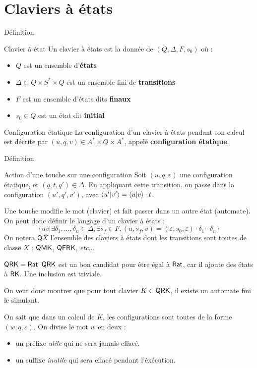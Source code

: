 \documentclass[11pt,french]{beamer}
\begin{document}
\section{Claviers à états}
\begin{frame}{Définition}
	\begin{block}{Clavier à état}
		Un clavier à états est la donnée de $(Q,\Delta ,F,s_0)$ où :
        \begin{itemize}
            \item $Q$ est un ensemble d'\textbf{états}
            \item $\Delta \subset Q \times S^* \times Q$ est un ensemble fini de \textbf{transitions}
            \item $F$ est un ensemble d'états dits \textbf{finaux}
            \item $s_0 \in Q$ est un état dit \textbf{initial}
        \end{itemize}
	\end{block}
	\pause
	\begin{block}{Configuration étatique}
		La configuration d'un clavier à états pendant son calcul est décrite par $(u,q,v) \in A^* \times Q \times A^*$, appelé \textbf{configuration étatique}.
	\end{block}
\end{frame}
\begin{frame}{Définition}
	\begin{exampleblock}{Action d'une touche sur une configuration}	
		Soit $(u,q,v)$ une configuration étatique, et $(q,t,q') \in \Delta$. En appliquant cette transition, on passe dans la configuration $(u',q',v')$, avec $\left\langle u' \middle| v' \right\rangle = \left\langle u \middle| v \right\rangle \cdot t$.
	\end{exampleblock}
	Une touche modifie le mot (clavier) et fait passer dans un autre état (automate).
	\pause
    On peut donc définir le langage d'un clavier à états :
    \[ \{uv | \exists\delta_1,...,\delta_n \in \Delta, \exists s_f \in F, (u,s_f,v) = (\varepsilon,s_0,\varepsilon)\cdot\delta_1\cdots\delta_n \}\]
	\pause
    On notera $\mathsf{Q}X$ l'ensemble des claviers à états dont les transitions sont toutes de classe $X$ : $\mathsf{QMK}$, $\mathsf{QFRK}$, \textit{etc}... 
\end{frame}
\begin{frame}{$\mathsf{QRK} = \mathsf{Rat}$}
	$\mathsf{QRK}$ est un bon candidat pour être égal à $\mathsf{Rat}$, car il ajoute des états à $\mathsf{RK}$.
	Une inclusion est triviale.
	\pause

	On veut donc montrer que pour tout clavier $K \in \mathsf{QRK}$, il existe un automate fini le simulant.
	\pause

	On sait que dans un calcul de $K$, les configurations sont toutes de la forme $(w,q,\varepsilon)$. On divise le mot $w$ en deux :
	\begin{itemize}
		\item un préfixe \emph{utile} qui ne sera jamais effacé.
		\item un suffixe \emph{inutile} qui sera effacé pendant l'éxécution.
	\end{itemize}
\end{frame}
\end{document}
